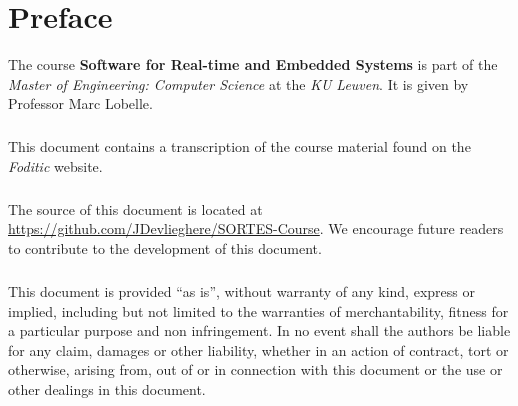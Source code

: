 \chapter*{Preface}
The course \textbf{Software for Real-time and Embedded Systems} is part of the \emph{Master of Engineering: Computer Science} at the \emph{KU Leuven}. It is given by Professor Marc Lobelle.
\paragraph{}
This document contains a transcription of the course material found on the \emph{Foditic} website.
\paragraph{}
The source of this document is located at \url{https://github.com/JDevlieghere/SORTES-Course}. We encourage future readers to contribute to the development of this document.
\paragraph{}
This document is provided ``as is'', without warranty of any kind, express or implied, including but not limited to the warranties of merchantability, fitness for a particular purpose and non infringement.
In no event shall the authors be liable for any claim, damages or other liability, whether in an action of contract, tort or otherwise, arising from, out of or in connection with this document or the use or other dealings in this document.